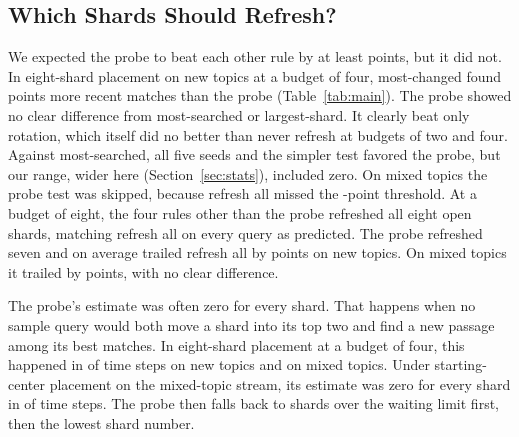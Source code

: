 \subsection{Which Shards Should Refresh?}
\label{sec:res-which}

We expected the probe to beat each other rule by at least \RNumPlainGateThreshold{} points, but it did not.
In eight-shard placement on new topics at a budget of four, most-changed found \RNumPlainHThreeBRNMinusDCNewTopic{} points more recent matches than the probe (Table~\ref{tab:main}).
The probe showed no clear difference from most-searched or largest-shard.
It clearly beat only rotation, which itself did no better than never refresh at budgets of two and four.
Against most-searched, all five seeds and the simpler test favored the probe, but our range, wider here (Section~\ref{sec:stats}), included zero.
On mixed topics the probe test was skipped, because refresh all missed the \RNumPlainGateThreshold{}-point threshold.
At a budget of eight, the four rules other than the probe refreshed all eight open shards, matching refresh all on every query as predicted.
The probe refreshed seven and on average trailed refresh all by \RNumPlainPredRNBEightNewTopic{} points on new topics.
On mixed topics it trailed by \RNumPlainPredRNBEightSteady{} points, with no clear difference.

The probe's estimate was often zero for every shard.
That happens when no sample query would both move a shard into its top two and find a new passage among its \RNumPlainTopK{} best matches.
In eight-shard placement at a budget of four, this happened in \RNumSpearmanZeroPctNewTopicMThree{} of time steps on new topics and \RNumSpearmanZeroPctSteadyMThree{} on mixed topics.
Under starting-center placement on the mixed-topic stream, its estimate was zero for every shard in \RNumSpearmanZeroPctSteadyMOne{} of time steps.
The probe then falls back to shards over the waiting limit first, then the lowest shard number.


